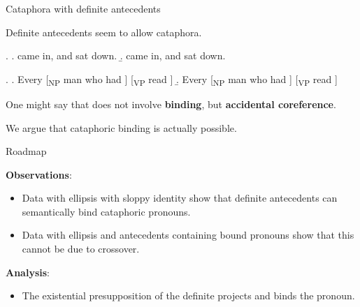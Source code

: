 \documentclass{beamer}
\begin{document}
\begin{frame}{Cataphora with definite antecedents}

Definite antecedents seem to allow \alert{cataphora}.

\ex.
  \a.  came in, and  sat down.
  \b.  came in, and  sat down.

\medskip

\ex.
  \a. Every [\textsubscript{NP} man who had ] [\textsubscript{VP} read ]
  \b. Every [\textsubscript{NP} man who had ] [\textsubscript{VP} read ]

One might say that \Last[b] does not involve {\bf binding}, but {\bf accidental coreference}.

We argue that cataphoric binding is actually possible.


\end{frame}

\begin{frame}{Roadmap}

{\bf Observations}:
\begin{itemize}
  \item Data with \alert{ellipsis with sloppy identity} show that definite antecedents can semantically bind cataphoric pronouns.
  \item Data with ellipsis and antecedents containing bound pronouns show that this cannot be due to \alert{crossover}.
\end{itemize}

{\bf Analysis}:
\begin{itemize}
  \item The existential presupposition of the definite projects and binds the pronoun.
\end{itemize}

\end{frame}
\end{document}
